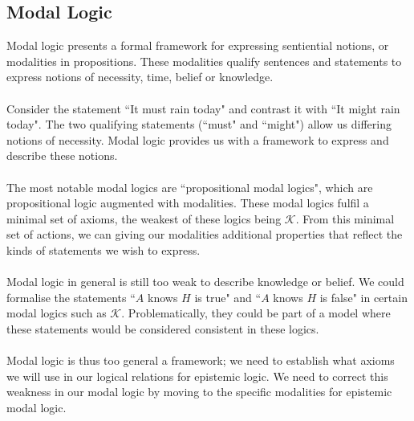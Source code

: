 \documentclass[10pt, a4paper, twoside]{article}
\begin{document}
\subsection{Modal Logic}\label{epistemic_modal}
Modal logic presents a formal framework for expressing sentiential notions, or
modalities in propositions.
These modalities qualify sentences and statements to express notions of
necessity, time, belief or knowledge.\\
\\
Consider the statement ``It must rain today" and contrast it with ``It
might rain today".
The two qualifying statements (``must" and ``might") allow us differing notions
of necessity.
Modal logic provides us with a framework to express and describe these
notions.\\
\\
The most notable modal logics are ``propositional modal logics", which are
propositional logic augmented with modalities.
These modal logics fulfil a minimal set of axioms, the weakest of these logics
being $\mathcal{K}$.
From this minimal set of actions, we can giving our modalities additional
properties that reflect the kinds of statements we wish to express.\\
\\
Modal logic in general is still too weak to describe knowledge or belief.
We could formalise the statements ``$A$ knows $H$ is true" and ``$A$ knows $H$
is false" in certain modal logics such as $\mathcal{K}$.
Problematically, they could be part of a model where these statements would be
considered consistent in these logics.\\
\\
Modal logic is thus too general a framework; we need to establish what axioms we
will use in our logical relations for epistemic logic.
We need to correct this weakness in our modal logic by moving to the specific
modalities for epistemic modal logic.
\end{document}
